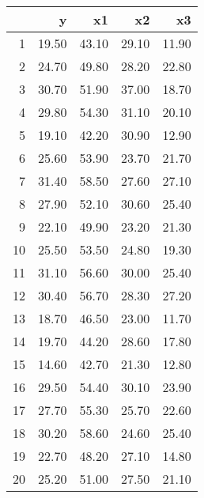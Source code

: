 \begin{table}[ht]
\centering
\begin{tabular}{rrrrr}
  \hline
 & y & x1 & x2 & x3 \\ 
  \hline
1 & 19.50 & 43.10 & 29.10 & 11.90 \\ 
  2 & 24.70 & 49.80 & 28.20 & 22.80 \\ 
  3 & 30.70 & 51.90 & 37.00 & 18.70 \\ 
  4 & 29.80 & 54.30 & 31.10 & 20.10 \\ 
  5 & 19.10 & 42.20 & 30.90 & 12.90 \\ 
  6 & 25.60 & 53.90 & 23.70 & 21.70 \\ 
  7 & 31.40 & 58.50 & 27.60 & 27.10 \\ 
  8 & 27.90 & 52.10 & 30.60 & 25.40 \\ 
  9 & 22.10 & 49.90 & 23.20 & 21.30 \\ 
  10 & 25.50 & 53.50 & 24.80 & 19.30 \\ 
  11 & 31.10 & 56.60 & 30.00 & 25.40 \\ 
  12 & 30.40 & 56.70 & 28.30 & 27.20 \\ 
  13 & 18.70 & 46.50 & 23.00 & 11.70 \\ 
  14 & 19.70 & 44.20 & 28.60 & 17.80 \\ 
  15 & 14.60 & 42.70 & 21.30 & 12.80 \\ 
  16 & 29.50 & 54.40 & 30.10 & 23.90 \\ 
  17 & 27.70 & 55.30 & 25.70 & 22.60 \\ 
  18 & 30.20 & 58.60 & 24.60 & 25.40 \\ 
  19 & 22.70 & 48.20 & 27.10 & 14.80 \\ 
  20 & 25.20 & 51.00 & 27.50 & 21.10 \\ 
   \hline
\end{tabular}
\end{table}
